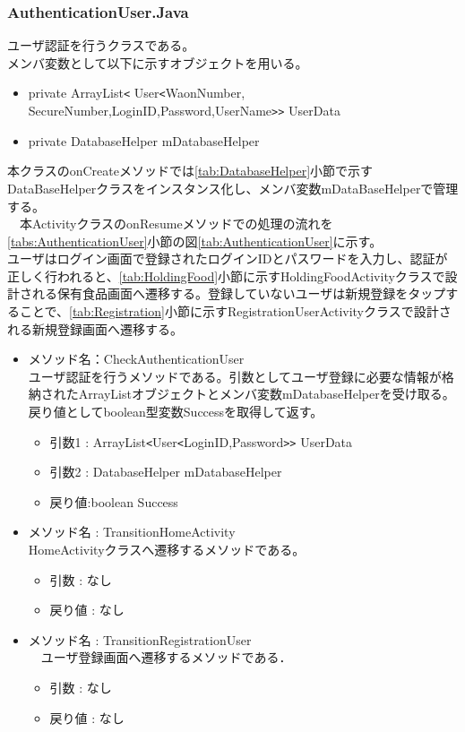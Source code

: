 \documentclass[a4j]{jarticle}
\begin{document}
\subsubsection{AuthenticationUser.Java}
\label{tab:Authentication}
ユーザ認証を行うクラスである。\\
メンバ変数として以下に示すオブジェクトを用いる。\\
\begin{itemize}
\item  private ArrayList\verb|<| User\verb|<|WaonNumber, SecureNumber,LoginID,Password,UserName\verb|>>| UserData
\item private DatabaseHelper mDatabaseHelper
\end{itemize}
本クラスのonCreateメソッドでは\ref{tab:DatabaseHelper}小節で示すDataBaseHelperクラスをインスタンス化し、メンバ変数mDataBaseHelperで管理する。\\
　本ActivityクラスのonResumeメソッドでの処理の流れを\ref{tabs:AuthenticationUser}小節の図\ref{tab:AuthenticationUser}に示す。\\
ユーザはログイン画面で登録されたログインIDとパスワードを入力し、認証が正しく行われると、\ref{tab:HoldingFood}小節に示すHoldingFoodActivityクラスで設計される保有食品画面へ遷移する。登録していないユーザは新規登録をタップすることで、\ref{tab:Registration}小節に示すRegistrationUserActivityクラスで設計される新規登録画面へ遷移する。
\begin{itemize}
\item メソッド名：CheckAuthenticationUser\\
  ユーザ認証を行うメソッドである。引数としてユーザ登録に必要な情報が格納されたArrayListオブジェクトとメンバ変数mDatabaseHelperを受け取る。戻り値としてboolean型変数Successを取得して返す。
  \begin{itemize}
  \item 引数1 : ArrayList\verb|<|User\verb|<|LoginID,Password\verb|>>| UserData
  \item 引数2 : DatabaseHelper mDatabaseHelper
  \item 戻り値:boolean Success
  \end{itemize}
\item メソッド名 : TransitionHomeActivity\\
  HomeActivityクラスへ遷移するメソッドである。
\begin{itemize}
  \item 引数 : なし
  \item 戻り値 : なし
\end{itemize}
\item メソッド名 : TransitionRegistrationUser\\
　ユーザ登録画面へ遷移するメソッドである．\\
\begin{itemize}
  \item 引数 : なし
  \item 戻り値 : なし
\end{itemize}
\end{itemize}
\end{document}
